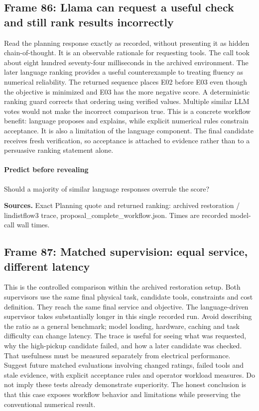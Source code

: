 \documentclass[11pt]{article}
\begin{document}
\subsection*{Frame 86: Llama can request a useful check and still rank results incorrectly}
Read the planning response exactly as recorded, without presenting it as hidden chain-of-thought. It is an observable rationale for requesting tools. The call took about eight hundred seventy-four milliseconds in the archived environment. The later language ranking provides a useful counterexample to treating fluency as numerical reliability. The returned sequence places E02 before E03 even though the objective is minimized and E03 has the more negative score. A deterministic ranking guard corrects that ordering using verified values. Multiple similar LLM votes would not make the incorrect comparison true. This is a concrete workflow benefit: language proposes and explains, while explicit numerical rules constrain acceptance. It is also a limitation of the language component. The final candidate receives fresh verification, so acceptance is attached to evidence rather than to a persuasive ranking statement alone.\par
\paragraph{Predict before revealing}Should a majority of similar language responses overrule the score?
\par\nopagebreak\begin{minipage}{\linewidth}{\footnotesize\color{slate}\textbf{Sources.} Exact Planning quote and returned ranking: archived restoration / lindistflow3 trace, proposal\_complete\_workflow.json. Times are recorded model-call wall times.\par}\end{minipage}\par\medskip
\subsection*{Frame 87: Matched supervision: equal service, different latency}
This is the controlled comparison within the archived restoration setup. Both supervisors use the same final physical task, candidate tools, constraints and cost definition. They reach the same final service and objective. The language-driven supervisor takes substantially longer in this single recorded run. Avoid describing the ratio as a general benchmark; model loading, hardware, caching and task difficulty can change latency. The trace is useful for seeing what was requested, why the high-pickup candidate failed, and how a later candidate was checked. That usefulness must be measured separately from electrical performance. Suggest future matched evaluations involving changed ratings, failed tools and stale evidence, with explicit acceptance rules and operator workload measures. Do not imply these tests already demonstrate superiority. The honest conclusion is that this case exposes workflow behavior and limitations while preserving the conventional numerical result.\par
\end{document}
